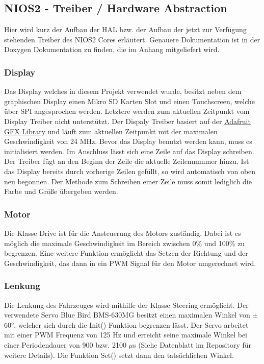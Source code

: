 \subsection{NIOS2 - Treiber / Hardware Abstraction}
Hier wird kurz der Aufbau der HAL bzw. der Aufbau der jetzt zur Verfügung stehenden Treiber des NIOS2 Cores erläutert. Genauere Dokumentation ist in der Doxygen Dokumentation zu finden, die im Anhang mitgeliefert wird. 
\subsubsection{Display}
Das Display welches in diesem Projekt verwendet wurde, besitzt neben dem graphischen Display einen Mikro SD Karten Slot und einen Touchscreen, welche über SPI angesprochen werden. Letztere werden zum aktuellen Zeitpunkt vom Display Treiber nicht unterstützt. Der Dispaly Treiber basiert auf der \href{https://github.com/adafruit/Adafruit-GFX-Library}{Adafruit GFX Library} und läuft zum aktuellen Zeitpunkt mit der maximalen Geschwindigkeit von 24 MHz. Bevor das Display benutzt werden kann, muss es initialisiert werden. Im Anschluss lässt sich eine Zeile auf das Display schreiben. Der Treiber fügt an den Beginn der Zeile die aktuelle Zeilennummer hinzu. Ist das Display bereits durch vorherige Zeilen gefüllt, so wird automatisch von oben neu begonnen. Der Methode zum Schreiben einer Zeile muss somit lediglich die Farbe und Größe übergeben werden.
\subsubsection{Motor}
Die Klasse Drive ist für die Ansteuerung des Motors zuständig. Dabei ist es möglich die maximale Geschwindigkeit im Bereich zwischen 0\% und 100\% zu begrenzen. Eine weitere Funktion ermöglicht das Setzen der Richtung und der Geschwindigkeit, das dann in ein PWM Signal für den Motor umgerechnet wird. 
\subsubsection{Lenkung}
Die Lenkung des Fahrzeuges wird mithilfe der Klasse Steering ermöglicht. Der verwendete Servo Blue Bird BMS-630MG besitzt einen maximalen Winkel von $\pm$60°, welcher sich durch die Init() Funktion begrenzen lässt. Der Servo arbeitet mit einer PWM Frequenz von 125 Hz und erreicht seine maximale Winkel bei einer Periodendauer von 900 bzw. 2100 $\mu$s (Siehe Datenblatt im Repository für weitere Details). Die Funktion Set() setzt dann den tatsächlichen Winkel.
